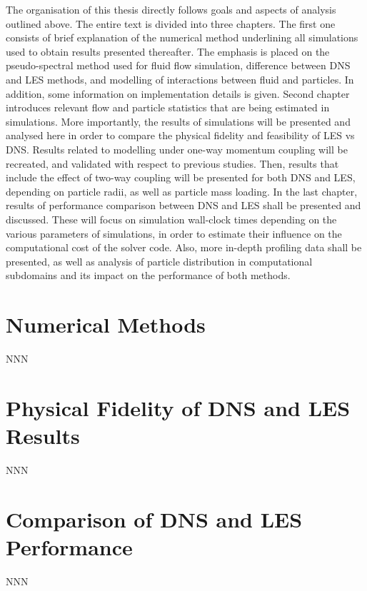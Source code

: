 \documentclass{pracamgren}
\begin{document}
The organisation of this thesis directly follows goals and aspects of analysis outlined above.
The entire text is divided into three chapters.
The first one consists of brief explanation of the numerical method underlining all simulations used to obtain results presented thereafter.
The emphasis is placed on the pseudo-spectral method used for fluid flow simulation, difference between DNS and LES methods, and modelling of interactions between fluid and particles.
In addition, some information on implementation details is given.
Second chapter introduces relevant flow and particle statistics that are being estimated in simulations.
More importantly, the results of simulations will be presented and analysed here in order to compare the physical fidelity and feasibility of LES vs DNS.
Results related to modelling under one-way momentum coupling will be recreated, and validated with respect to previous studies.
Then, results that include the effect of two-way coupling will be presented for both DNS and LES, depending on particle radii, as well as particle mass loading.
In the last chapter, results of performance comparison between DNS and LES shall be presented and discussed.
These will focus on simulation wall-clock times depending on the various parameters of simulations, in order to estimate their influence on the computational cost of the solver code.
Also, more in-depth profiling data shall be presented, as well as analysis of particle distribution in computational subdomains and its impact on the performance of both methods.



\chapter{Numerical Methods}
\label{ch:ch1}

NNN


\chapter{Physical Fidelity of DNS and LES Results}
\label{ch:ch2}

NNN



\chapter{Comparison of DNS and LES Performance}
\label{ch:ch3}

NNN
\end{document}

